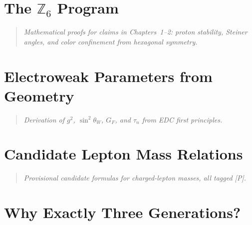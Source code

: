 \documentclass[11pt,a4paper]{book}
\theoremstyle{definition}
\theoremstyle{remark}
\begin{document}
\chapter{The $\mathbb{Z}_6$ Program}
\label{ch:z6_program}

\begin{quote}
\textit{Mathematical proofs for claims in Chapters~1--2: proton stability, Steiner angles,
and color confinement from hexagonal symmetry.}
\end{quote}



\chapter{Electroweak Parameters from Geometry}
\label{ch:electroweak}

\begin{quote}
\textit{Derivation of $g^2$, $\sin^2\theta_W$, $G_F$, and $\tau_n$ from EDC first principles.}
\end{quote}



\chapter{Candidate Lepton Mass Relations}
\label{ch:lepton_candidates}

\begin{quote}
\textit{Provisional candidate formulas for charged-lepton masses, all tagged [P].}
\end{quote}



\chapter{Why Exactly Three Generations?}
\label{ch:three_generations}
\end{document}
